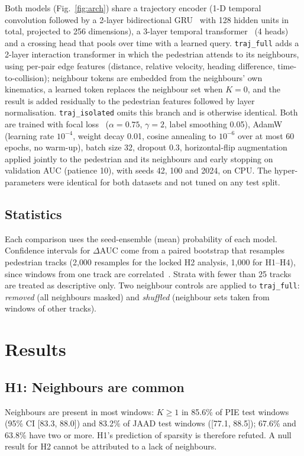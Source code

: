 \documentclass[conference]{IEEEtran}
\newcommand{\dauc}{$\Delta$AUC}
\begin{document}
Both models (Fig.~\ref{fig:arch}) share a trajectory encoder (1-D temporal convolution followed by a 2-layer bidirectional GRU~\cite{cho2014gru} with 128 hidden units in total, projected to 256 dimensions), a 3-layer temporal transformer~\cite{vaswani2017attention} (4 heads) and a crossing head that pools over time with a learned query. \texttt{traj\_full} adds a 2-layer interaction transformer in which the pedestrian attends to its neighbours, using per-pair edge features (distance, relative velocity, heading difference, time-to-collision); neighbour tokens are embedded from the neighbours' own kinematics, a learned token replaces the neighbour set when $K=0$, and the result is added residually to the pedestrian features followed by layer normalisation. \texttt{traj\_isolated} omits this branch and is otherwise identical. Both are trained with focal loss~\cite{lin2017focal} ($\alpha=0.75$, $\gamma=2$, label smoothing 0.05), AdamW~\cite{loshchilov2019adamw} (learning rate $10^{-4}$, weight decay 0.01, cosine annealing to $10^{-6}$ over at most 60 epochs, no warm-up), batch size 32, dropout 0.3, horizontal-flip augmentation applied jointly to the pedestrian and its neighbours and early stopping on validation AUC (patience 10), with seeds 42, 100 and 2024, on CPU. The hyper-parameters were identical for both datasets and not tuned on any test split.

\subsection{Statistics}
Each comparison uses the seed-ensemble (mean) probability of each model. Confidence intervals for \dauc{} come from a paired bootstrap that resamples pedestrian tracks (2{,}000 resamples for the locked H2 analysis, 1{,}000 for H1--H4), since windows from one track are correlated~\cite{efron1993bootstrap}. Strata with fewer than 25 tracks are treated as descriptive only. Two neighbour controls are applied to \texttt{traj\_full}: \emph{removed} (all neighbours masked) and \emph{shuffled} (neighbour sets taken from windows of other tracks).

\section{Results}

\subsection{H1: Neighbours are common}
Neighbours are present in most windows: $K\ge1$ in 85.6\% of PIE test windows (95\% CI [83.3, 88.0]) and 83.2\% of JAAD test windows ([77.1, 88.5]); 67.6\% and 63.8\% have two or more. H1's prediction of sparsity is therefore refuted. A null result for H2 cannot be attributed to a lack of neighbours.
\end{document}
